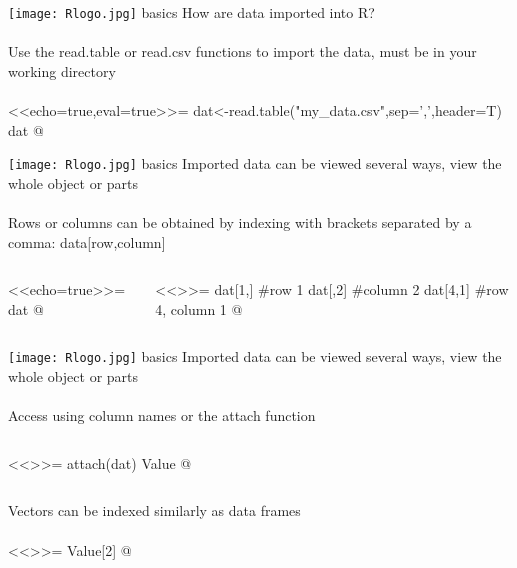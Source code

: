 \documentclass[xcolor=svgnames]{beamer}
\begin{document}
\begin{frame}[t,fragile]{\texttt{[image: Rlogo.jpg]} \hspace{0.01in} basics}
How are data imported into R?\\~\\
Use the read.table or read.csv functions to import the data, must be in your working directory\\~\\
<<echo=true,eval=true>>=
dat<-read.table("my_data.csv",sep=',',header=T)
dat
@
\end{frame}

\begin{frame}[t,fragile]{\texttt{[image: Rlogo.jpg]} \hspace{0.01in} basics}
Imported data can be viewed several ways, view the whole object or parts \\~\\
Rows or columns can be obtained by indexing with brackets separated by a comma: data[row,column]
\begin{columns}[t]
\begin{column}{0.45\textwidth}
<<echo=true>>=
dat
@
\end{column}
\begin{column}{0.45\textwidth}
<<>>=
dat[1,] #row 1
dat[,2] #column 2
dat[4,1] #row 4, column 1
@
\end{column}
\end{columns}
\end{frame}

\begin{frame}[t,fragile]{\texttt{[image: Rlogo.jpg]} \hspace{0.01in} basics}
Imported data can be viewed several ways, view the whole object or parts \\~\\
Access using column names or the attach function
\begin{columns}[t]
\begin{column}{0.49\textwidth}
<<>>=
attach(dat)
Value
@
\end{column}
\end{columns}
\vspace{0.3in}
Vectors can be indexed similarly as data frames\\~\\
<<>>=
Value[2]
@
\end{frame}
\end{document}
